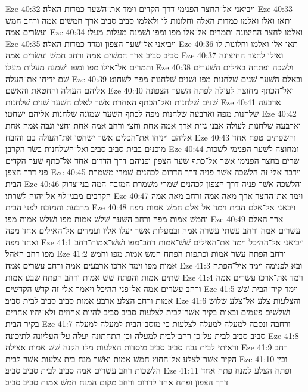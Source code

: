Eze 40:32  ויביאני אל־החצר הפנימי דרך הקדים וימד את־השׁער כמדות האלה׃
Eze 40:33  ותאו ואלו ואלמו כמדות האלה וחלונות לו ולאלמו סביב סביב ארך חמשׁים אמה ורחב חמשׁ ועשׂרים אמה׃
Eze 40:34  ואלמו לחצר החיצונה ותמרים אל־אלו מפו ומפו ושׁמנה מעלות מעלו׃
Eze 40:35  ויביאני אל־שׁער הצפון ומדד כמדות האלה׃
Eze 40:36  תאו אלו ואלמו וחלונות לו סביב סביב ארך חמשׁים אמה ורחב חמשׁ ועשׂרים אמה׃
Eze 40:37  ואילו לחצר החיצונה ותמרים אל־אילו מפו ומפו ושׁמנה מעלות מעלו׃
Eze 40:38  ולשׁכה ופתחה באילים השׁערים שׁם ידיחו את־העלה׃
Eze 40:39  ובאלם השׁער שׁנים שׁלחנות מפו ושׁנים שׁלחנות מפה לשׁחוט אליהם העולה והחטאת והאשׁם׃
Eze 40:40  ואל־הכתף מחוצה לעולה לפתח השׁער הצפונה שׁנים שׁלחנות ואל־הכתף האחרת אשׁר לאלם השׁער שׁנים שׁלחנות׃
Eze 40:41  ארבעה שׁלחנות מפה וארבעה שׁלחנות מפה לכתף השׁער שׁמונה שׁלחנות אליהם ישׁחטו׃
Eze 40:42  וארבעה שׁלחנות לעולה אבני גזית ארך אמה אחת וחצי ורחב אמה אחת וחצי וגבה אמה אחת אליהם ויניחו את־הכלים אשׁר ישׁחטו את־העולה בם והזבח׃
Eze 40:43  והשׁפתים טפח אחד מוכנים בבית סביב סביב ואל־השׁלחנות בשׂר הקרבן׃
Eze 40:44  ומחוצה לשׁער הפנימי לשׁכות שׁרים בחצר הפנימי אשׁר אל־כתף שׁער הצפון ופניהם דרך הדרום אחד אל־כתף שׁער הקדים פני דרך הצפן׃
Eze 40:45  וידבר אלי זה הלשׁכה אשׁר פניה דרך הדרום לכהנים שׁמרי משׁמרת הבית׃
Eze 40:46  והלשׁכה אשׁר פניה דרך הצפון לכהנים שׁמרי משׁמרת המזבח המה בני־צדוק הקרבים מבני־לוי אל־יהוה לשׁרתו׃
Eze 40:47  וימד את־החצר ארך מאה אמה ורחב מאה אמה מרבעת והמזבח לפני הבית׃
Eze 40:48  ויבאני אל־אלם הבית וימד אל אלם חמשׁ אמות מפה וחמשׁ אמות מפה ורחב השׁער שׁלשׁ אמות מפו ושׁלשׁ אמות מפו׃
Eze 40:49  ארך האלם עשׂרים אמה ורחב עשׁתי עשׂרה אמה ובמעלות אשׁר יעלו אליו ועמדים אל־האילים אחד מפה ואחד מפה׃
Eze 41:1  ויביאני אל־ההיכל וימד את־האילים שׁשׁ־אמות רחב־מפו ושׁשׁ־אמות־רחב מפו רחב האהל׃
Eze 41:2  ורחב הפתח עשׂר אמות וכתפות הפתח חמשׁ אמות מפו וחמשׁ אמות מפו וימד ארכו ארבעים אמה ורחב עשׂרים אמה׃
Eze 41:3  ובא לפנימה וימד איל־הפתח שׁתים אמות והפתח שׁשׁ אמות ורחב הפתח שׁבע אמות׃
Eze 41:4  וימד את־ארכו עשׂרים אמה ורחב עשׂרים אמה אל־פני ההיכל ויאמר אלי זה קדשׁ הקדשׁים׃
Eze 41:5  וימד קיר־הבית שׁשׁ אמות ורחב הצלע ארבע אמות סביב סביב לבית סביב׃
Eze 41:6  והצלעות צלע אל־צלע שׁלושׁ ושׁלשׁים פעמים ובאות בקיר אשׁר־לבית לצלעות סביב סביב להיות אחוזים ולא־יהיו אחוזים בקיר הבית׃
Eze 41:7  ורחבה ונסבה למעלה למעלה לצלעות כי מוסב־הבית למעלה למעלה סביב סביב לבית על־כן רחב־לבית למעלה וכן התחתונה יעלה על־העליונה לתיכונה׃
Eze 41:8  וראיתי לבית גבה סביב סביב מיסדות הצלעות מלו הקנה שׁשׁ אמות אצילה׃
Eze 41:9  רחב הקיר אשׁר־לצלע אל־החוץ חמשׁ אמות ואשׁר מנח בית צלעות אשׁר לבית׃
Eze 41:10  ובין הלשׁכות רחב עשׂרים אמה סביב לבית סביב סביב׃
Eze 41:11  ופתח הצלע למנח פתח אחד דרך הצפון ופתח אחד לדרום ורחב מקום המנח חמשׁ אמות סביב סביב׃
